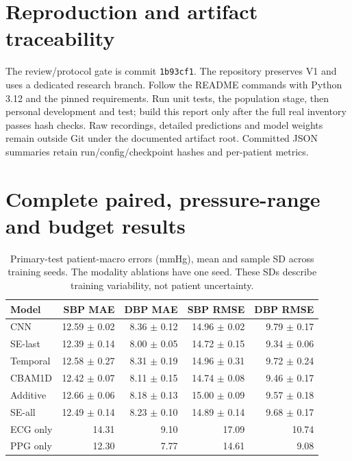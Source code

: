 \documentclass[11pt]{article}
\begin{document}
\section{Reproduction and artifact traceability}
The review/protocol gate is commit \texttt{1b93cf1}. The repository preserves V1 and uses
a dedicated research branch. Follow the README commands with Python 3.12 and
the pinned requirements. Run unit tests, the population stage, then personal
development and test; build this report only after the full real inventory
passes hash checks. Raw recordings, detailed predictions and model weights
remain outside Git under the documented artifact root. Committed JSON
summaries retain run/config/checkpoint hashes and per-patient metrics.
\onecolumn\appendix\section{Complete paired, pressure-range and budget results}\label{sec:complete}
\begin{table}[!htbp]\centering\small
\begin{tabular}{lrrrr}\toprule
Model & SBP MAE & DBP MAE & SBP RMSE & DBP RMSE\\\midrule
CNN & 12.59 $\pm$ 0.02 & 8.36 $\pm$ 0.12 & 14.96 $\pm$ 0.02 & 9.79 $\pm$ 0.17\\
SE-last & 12.39 $\pm$ 0.14 & 8.00 $\pm$ 0.05 & 14.72 $\pm$ 0.15 & 9.34 $\pm$ 0.06\\
Temporal & 12.58 $\pm$ 0.27 & 8.31 $\pm$ 0.19 & 14.96 $\pm$ 0.31 & 9.72 $\pm$ 0.24\\
CBAM1D & 12.42 $\pm$ 0.07 & 8.11 $\pm$ 0.15 & 14.74 $\pm$ 0.08 & 9.46 $\pm$ 0.17\\
Additive & 12.66 $\pm$ 0.06 & 8.18 $\pm$ 0.13 & 15.00 $\pm$ 0.09 & 9.57 $\pm$ 0.18\\
SE-all & 12.49 $\pm$ 0.14 & 8.23 $\pm$ 0.10 & 14.89 $\pm$ 0.14 & 9.68 $\pm$ 0.17\\
ECG only & 14.31 & 9.10 & 17.09 & 10.74\\
PPG only & 12.30 & 7.77 & 14.61 & 9.08\\
\bottomrule\end{tabular}
\caption{Primary-test patient-macro errors (mmHg), mean and sample SD across training seeds. The modality ablations have one seed. These SDs describe training variability, not patient uncertainty.}\end{table}
\end{document}
